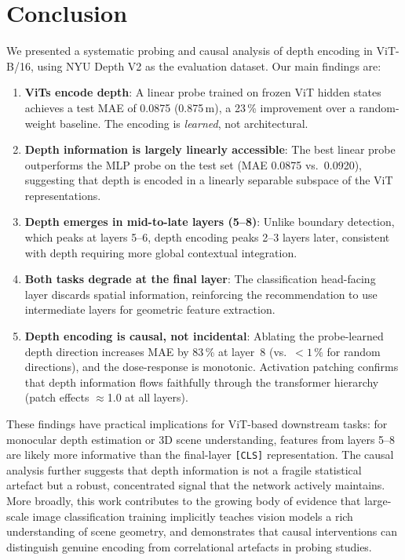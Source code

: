 \documentclass[11pt,a4paper]{article}
\begin{document}
\section{Conclusion}

We presented a systematic probing and causal analysis of depth encoding in
ViT-B/16, using NYU Depth V2 as the evaluation dataset.  Our main findings
are:

\begin{enumerate}
    \item \textbf{ViTs encode depth}: A linear probe trained on frozen ViT
          hidden states achieves a test MAE of 0.0875 (0.875\,m), a 23\,\%
          improvement over a random-weight baseline.  The encoding is
          \emph{learned}, not architectural.

    \item \textbf{Depth information is largely linearly accessible}: The
          best linear probe outperforms the MLP probe on the test set
          (MAE 0.0875 vs.\ 0.0920), suggesting that depth is encoded in a
          linearly separable subspace of the ViT representations.

    \item \textbf{Depth emerges in mid-to-late layers (5--8)}: Unlike
          boundary detection, which peaks at layers 5--6, depth encoding
          peaks 2--3 layers later, consistent with depth requiring more
          global contextual integration.

    \item \textbf{Both tasks degrade at the final layer}: The classification
          head-facing layer discards spatial information, reinforcing the
          recommendation to use intermediate layers for geometric feature
          extraction.

    \item \textbf{Depth encoding is causal, not incidental}: Ablating the
          probe-learned depth direction increases MAE by 83\,\% at layer~8
          (vs.\ $<\!1\,\%$ for random directions), and the dose-response is
          monotonic.  Activation patching confirms that depth information
          flows faithfully through the transformer hierarchy (patch effects
          $\approx$1.0 at all layers).
\end{enumerate}

These findings have practical implications for ViT-based downstream tasks:
for monocular depth estimation or 3D scene understanding, features from
layers 5--8 are likely more informative than the final-layer \texttt{[CLS]}
representation.  The causal analysis further suggests that depth information
is not a fragile statistical artefact but a robust, concentrated signal that
the network actively maintains.  More broadly, this work contributes to the
growing body of evidence that large-scale image classification training
implicitly teaches vision models a rich understanding of scene geometry, and
demonstrates that causal interventions can distinguish genuine encoding from
correlational artefacts in probing studies.
\end{document}
